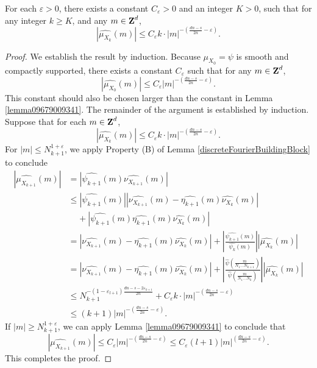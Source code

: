 \begin{lemma}
    For each $\varepsilon > 0$, there exists a constant $C_\varepsilon > 0$ and an integer $K > 0$, such that for any integer $k \geq K$, and any $m \in \operatorname{\mathbf{Z}}^d$,
    \[ |\widehat{\mu_{X_k}}(m)| \leq C_\varepsilon k \cdot |m|^{- \left( \frac{dn - s}{2n} - \varepsilon \right)}. \]
\end{lemma}
\begin{proof}
    We establish the result by induction. Because $\mu_{X_0} = \psi$ is smooth and compactly supported, there exists a constant $C_\varepsilon$ such that for any $m \in \operatorname{\mathbf{Z}}^d$,
    \[ |\widehat{\mu_{X_0}}(m)| \leq C_\varepsilon |m|^{- \left( \frac{dn - s}{2n} - \varepsilon \right)}. \]
    This constant should also be chosen larger than the constant in Lemma \ref{lemma09679009341}. The remainder of the argument is established by induction. Suppose that for each $m \in \operatorname{\mathbf{Z}}^d$,
    \[ |\widehat{\mu_{X_k}}(m)| \leq C_\varepsilon k \cdot |m|^{- \left( \frac{dn - s}{2n} - \varepsilon \right)}. \]
    For $|m| \leq N_{k+1}^{1 + \varepsilon}$, we apply Property (B) of Lemma \ref{discreteFourierBuildingBlock} to conclude
    \begin{align*}
        |\widehat{\mu_{X_{k+1}}}(m)| &= |\widehat{\psi_{k+1}}(m) \widehat{\nu_{X_{k+1}}}(m)|\\
        &\leq |\widehat{\psi_{k+1}}(m)| |\widehat{\nu_{X_{k+1}}}(m) - \widehat{\eta_{k+1}}(m) \widehat{\nu_{X_k}}(m)|\\
        &\ \ \ \ \ + |\widehat{\psi_{k+1}}(m) \widehat{\eta_{k+1}}(m) \widehat{\nu_{X_k}}(m)|\\
        &= |\widehat{\nu_{X_{k+1}}}(m) - \widehat{\eta_{k+1}}(m) \widehat{\nu_{X_k}}(m)| + \left| \frac{\widehat{\psi_{k+1}}(m)}{\widehat{\psi_k}(m)} \right| |\widehat{\mu_{X_k}}(m)|\\
        &= |\widehat{\nu_{X_{k+1}}}(m) - \widehat{\eta_{k+1}}(m) \widehat{\nu_{X_k}}(m)| + \left| \frac{\widehat{\psi} \left( \frac{m}{N_1 \dots N_{k+1}} \right)}{\widehat{\psi} \left( \frac{m}{N_1 \dots N_k} \right)} \right| |\widehat{\mu_{X_k}}(m)|\\
        &\leq N_{k+1}^{-(1-\varepsilon_{l+1}) \frac{dn - s - 2\varepsilon_{k+1}}{2n}} + C_\varepsilon k \cdot |m|^{- \left( \frac{dn - s}{2n} - \varepsilon \right)}\\
        &\leq (k + 1) |m|^{- \left( \frac{dn - s}{2n} - \varepsilon \right)}.
    \end{align*}
    If $|m| \geq N_{k+1}^{1 + \varepsilon}$, we can apply Lemma \ref{lemma09679009341} to conclude that
    \[ |\widehat{\mu_{X_{k+1}}}(m)| \leq C_\varepsilon |m|^{- \left( \frac{dn - s}{2n} - \varepsilon \right)} \leq C_\varepsilon (l+1) |m|^{\left( \frac{dn - s}{2n} - \varepsilon \right)}. \]
    This completes the proof.
\end{proof}

